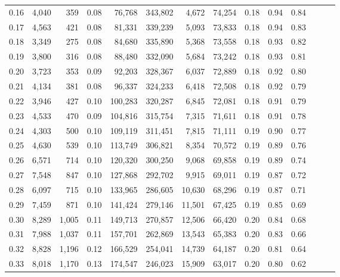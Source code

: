 \begin{tabular}{rrrrrrrrrrrrrr}
0.16 &   4,040 &    359 &  0.08 &   76,768 &  343,802 &   4,672 &  74,254 &  0.18 &  0.94 &      0.84 \\
0.17 &   4,563 &    421 &  0.08 &   81,331 &  339,239 &   5,093 &  73,833 &  0.18 &  0.94 &      0.83 \\
0.18 &   3,349 &    275 &  0.08 &   84,680 &  335,890 &   5,368 &  73,558 &  0.18 &  0.93 &      0.82 \\
0.19 &   3,800 &    316 &  0.08 &   88,480 &  332,090 &   5,684 &  73,242 &  0.18 &  0.93 &      0.81 \\
0.20 &   3,723 &    353 &  0.09 &   92,203 &  328,367 &   6,037 &  72,889 &  0.18 &  0.92 &      0.80 \\
0.21 &   4,134 &    381 &  0.08 &   96,337 &  324,233 &   6,418 &  72,508 &  0.18 &  0.92 &      0.79 \\
0.22 &   3,946 &    427 &  0.10 &  100,283 &  320,287 &   6,845 &  72,081 &  0.18 &  0.91 &      0.79 \\
0.23 &   4,533 &    470 &  0.09 &  104,816 &  315,754 &   7,315 &  71,611 &  0.18 &  0.91 &      0.78 \\
0.24 &   4,303 &    500 &  0.10 &  109,119 &  311,451 &   7,815 &  71,111 &  0.19 &  0.90 &      0.77 \\
0.25 &   4,630 &    539 &  0.10 &  113,749 &  306,821 &   8,354 &  70,572 &  0.19 &  0.89 &      0.76 \\
0.26 &   6,571 &    714 &  0.10 &  120,320 &  300,250 &   9,068 &  69,858 &  0.19 &  0.89 &      0.74 \\
0.27 &   7,548 &    847 &  0.10 &  127,868 &  292,702 &   9,915 &  69,011 &  0.19 &  0.87 &      0.72 \\
0.28 &   6,097 &    715 &  0.10 &  133,965 &  286,605 &  10,630 &  68,296 &  0.19 &  0.87 &      0.71 \\
0.29 &   7,459 &    871 &  0.10 &  141,424 &  279,146 &  11,501 &  67,425 &  0.19 &  0.85 &      0.69 \\
0.30 &   8,289 &  1,005 &  0.11 &  149,713 &  270,857 &  12,506 &  66,420 &  0.20 &  0.84 &      0.68 \\
0.31 &   7,988 &  1,037 &  0.11 &  157,701 &  262,869 &  13,543 &  65,383 &  0.20 &  0.83 &      0.66 \\
0.32 &   8,828 &  1,196 &  0.12 &  166,529 &  254,041 &  14,739 &  64,187 &  0.20 &  0.81 &      0.64 \\
0.33 &   8,018 &  1,170 &  0.13 &  174,547 &  246,023 &  15,909 &  63,017 &  0.20 &  0.80 &      0.62 \\

\end{tabular}
